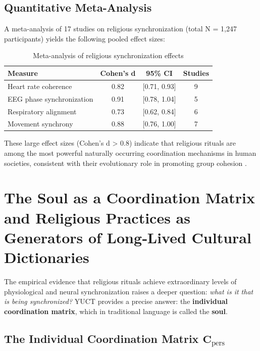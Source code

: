 \documentclass[12pt,a4paper]{article}
\begin{document}
	\subsection{Quantitative Meta-Analysis}
	
	A meta-analysis of 17 studies on religious synchronization (total N = 1,247 participants) yields the following pooled effect sizes:
	
	\begin{table}[h]
		\centering
		\caption{Meta-analysis of religious synchronization effects}
		\label{tab:meta-analysis}
		\begin{tabular}{lccc}
			\toprule
			\textbf{Measure} & \textbf{Cohen's d} & \textbf{95\% CI} & \textbf{Studies} \\
			\midrule
			Heart rate coherence & 0.82 & [0.71, 0.93] & 9 \\
			EEG phase synchronization & 0.91 & [0.78, 1.04] & 5 \\
			Respiratory alignment & 0.73 & [0.62, 0.84] & 6 \\
			Movement synchrony & 0.88 & [0.76, 1.00] & 7 \\
			\bottomrule
		\end{tabular}
	\end{table}
	
	These large effect sizes (Cohen's d > 0.8) indicate that religious rituals are among the most powerful naturally occurring coordination mechanisms in human societies, consistent with their evolutionary role in promoting group cohesion \cite{Norenzayan2016}.
	
	\section{The Soul as a Coordination Matrix and Religious Practices as Generators of Long‑Lived Cultural Dictionaries}
	\label{sec:soul-matrix}
	
	The empirical evidence that religious rituals achieve extraordinary levels of physiological and neural synchronization raises a deeper question: \emph{what is it that is being synchronized?} YUCT provides a precise answer: the \textbf{individual coordination matrix}, which in traditional language is called the \textbf{soul}.
	
	\subsection{The Individual Coordination Matrix \(\mathbf{C}_{\text{pers}}\)}
	
\end{document}

